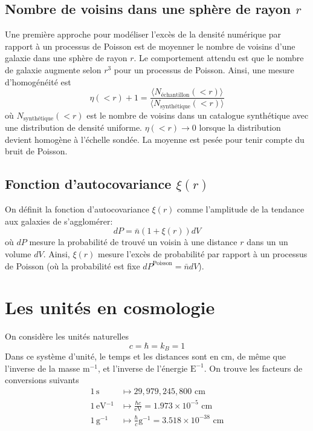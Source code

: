\documentclass{article}
\numberwithin{equation}{section}
\begin{document}
\subsection{Nombre de voisins dans une sphère de rayon $r$}
Une première approche pour modéliser l'excès de la densité numérique par rapport à 
un processus de Poisson est de moyenner le nombre de voisins d'une galaxie dans une 
sphère de rayon $r$. Le comportement attendu est que le nombre de galaxie augmente selon 
$r^3$ pour un processus de Poisson. Ainsi, une mesure d'homogénéité est 
\[
        \eta(< r) + 1 = \frac{\langle N_{\text{échantillon}}(<r)\rangle}{
        \langle N_{\text{synthétique}}(<r)\rangle}
\]
où $N_{\text{synthétique}}(<r)$ est le nombre de voisins dans un catalogue synthétique 
avec une distribution de densité uniforme. $\eta(<r) \rightarrow 0$ lorsque la distribution 
devient homogène à l'échelle sondée. La moyenne est pesée pour tenir compte du bruit de 
Poisson.


\subsection{Fonction d'autocovariance $\xi(r)$}

On définit la fonction d'autocovariance $\xi(r)$ comme l'amplitude de la tendance 
aux galaxies de s'agglomérer:
\[
        dP = \bar{n} (1 + \xi(r)) dV
\]
où $dP$ mesure la probabilité de trouvé un voisin à une distance $r$ dans un un volume $dV$. 
Ainsi, $\xi(r)$ mesure l'excès de probabilité par rapport à un processus de Poisson (où 
la probabilité est fixe $dP^{\text{Poisson}} = \bar{n}dV$). 




\section{Les unités en cosmologie}
On considère les unités naturelles
\[
        c = \hbar = k_B = 1
\]
Dans ce système d'unité, le temps et les distances sont en cm, de même que l'inverse de la masse $\text{m}^{-1}$, 
et l'inverse de l'énergie $\text{E}^{-1}$. On trouve les facteurs de conversions suivants
\begin{align*}
        1\, \text{s} &\mapsto  29,979,245,800 \,\, \text{cm} \\
        1\, \si{\electronvolt^{-1}} &\mapsto \frac{\hbar c }{\si{\electronvolt}}= 1.973 \times 10^{-5} \,\, \text{cm} \\
        1\, \text{g}^{-1} &\mapsto \frac{\hbar}{c} \text{g}^{-1} = 3.518 \times 10^{-38} \,\, \text{cm}   
\end{align*}
\end{document}
